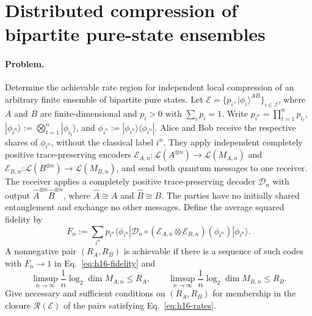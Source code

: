 \section{Distributed compression of bipartite pure-state ensembles}
\label{sec:op_396109643100aaca}

\paragraph{Problem.}
Determine the achievable rate region for independent local compression of an arbitrary finite ensemble of bipartite pure states. Let $\mathcal E=\{p_i,|\phi_i\rangle^{AB}\}_{i\in\mathcal I}$, where $A$ and $B$ are finite-dimensional and $p_i>0$ with $\sum_i p_i=1$. Write $p_{i^n}=\prod_{t=1}^n p_{i_t}$, $|\phi_{i^n}\rangle:=\bigotimes_{t=1}^n|\phi_{i_t}\rangle$, and $\phi_{i^n}:=|\phi_{i^n}\rangle\langle\phi_{i^n}|$. Alice and Bob receive the respective shares of $\phi_{i^n}$, without the classical label $i^n$. They apply independent completely positive trace-preserving encoders $\mathcal E_{A,n}:\mathcal L(A^{\otimes n})\to\mathcal L(M_{A,n})$ and $\mathcal E_{B,n}:\mathcal L(B^{\otimes n})\to\mathcal L(M_{B,n})$, and send both quantum messages to one receiver. The receiver applies a completely positive trace-preserving decoder $\mathcal D_n$ with output $\widehat A^{\otimes n}\widehat B^{\otimes n}$, where $\widehat A\cong A$ and $\widehat B\cong B$. The parties have no initially shared entanglement and exchange no other messages. Define the average squared fidelity by
\begin{equation}
 F_n:=\sum_{i^n}p_{i^n}\langle\phi_{i^n}|\mathcal D_n\circ(\mathcal E_{A,n}\otimes\mathcal E_{B,n})(\phi_{i^n})|\phi_{i^n}\rangle.
 \label{eq:h16-fidelity}
\end{equation}
A nonnegative pair $(R_A,R_B)$ is achievable if there is a sequence of such codes with $F_n\to1$ in Eq.~\eqref{eq:h16-fidelity} and
\begin{equation}
 \limsup_{n\to\infty}\frac1n\log_2\dim M_{A,n}\le R_A,\qquad
 \limsup_{n\to\infty}\frac1n\log_2\dim M_{B,n}\le R_B.
 \label{eq:h16-rates}
\end{equation}
Give necessary and sufficient conditions on $(R_A,R_B)$ for membership in the closure $\mathcal R(\mathcal E)$ of the pairs satisfying Eq.~\eqref{eq:h16-rates}.

